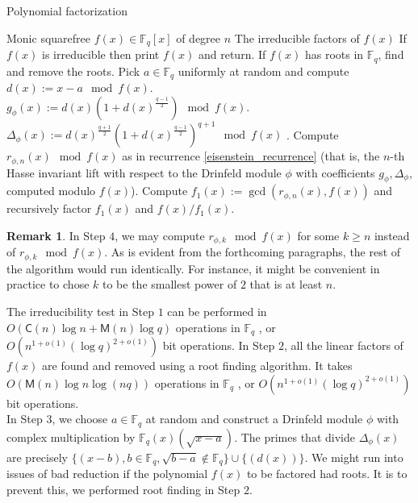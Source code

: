 \documentclass{article}
\theoremstyle{plain}
\theoremstyle{definition}
\newtheorem*{remark}{Remark}
\def\F{\ensuremath{\mathbb{F}}}
\def\K{\ensuremath{\mathbb{K}}}
\def\MM{\ensuremath{\mathsf{M}}}
\def\CC{\ensuremath{\mathsf{C}}}
\newcommand{\D}{\Delta}
\begin{document}
\begin{algorithm}[H]
	\caption{Polynomial factorization}
	\label{factoring_algorithm}
	\begin{algorithmic}[1]
		\REQUIRE Monic squarefree $f(x) \in \F_q[x]$ of degree $n$
		\ENSURE The irreducible factors of $f(x)$
		\STATE If $f(x)$ is irreducible then print $f(x)$ and return.
		\STATE If $f(x)$ has roots in $\F_q$, find and remove the roots.
		\STATE Pick $a \in \F_q$ uniformly at random and compute \\ %
		$d(x) := x-a \mod f(x)$. \\
		$g_\phi(x) := d(x)(1+d(x)^{\frac{q-1}{2}}) \mod f(x)$. \\
		$\Delta_\phi(x) := d(x)^{\frac{q+1}{2}}(1+d(x)^{\frac{q-1}{2}})^{q+1} \mod f(x)$ .
		\STATE Compute $r_{\phi,n}(x) \mod f(x)$ as in recurrence \ref{eisenstein_recurrence} (that is, the $n$-th Hasse invariant lift with respect to the Drinfeld module $\phi$ with coefficients $g_\phi, \Delta_\phi$, computed modulo $f(x)$).
		\STATE Compute $f_1(x) := \gcd(r_{\phi,n}(x), f(x))$ and recursively factor $f_1(x)$ and $f(x)/f_1(x)$.
	\end{algorithmic}
\end{algorithm}

\begin{remark}
	In Step $4$, we may compute $r_{\phi,k} \mod f(x)$ for some $k\geq n$ instead of $r_{\phi,k} \mod f(x)$. As is evident from the forthcoming paragraphs, the rest of the algorithm would run identically. For instance, it might be convenient in practice to chose $k$ to be the smallest power of $2$ that is at least $n$.
\end{remark}


The irreducibility test in Step $1$ can be performed in $O(\CC(n)\log n + \MM(n)\log q)$ operations 
in $\F_q$ \cite{vzGG}, or $O(n^{1+o(1)} (\log q)^{2+o(1)})$ bit operations. In Step $2$, all the 
linear factors of $f(x)$ are found and removed using a root finding algorithm. It takes 
$O(\MM(n)\log n \log(nq))$ operations in $\F_q$ \cite{vzGG}, or $O(n^{1+o(1)} (\log q)^{2+o(1)})$ 
bit operations. \\

 In Step $3$, we choose $a \in \F_q$ at random and construct a Drinfeld module $\phi$ with complex 
 multiplication by $\F_q(x)(\sqrt{x-a})$. The primes that divide $\D_\phi(x)$ are precisely 
 $\{(x-b),  b \in \F_q, \sqrt{b-a} \notin \F_q\} \cup \{(d(x))\}$. We might run into issues of bad 
 reduction if the polynomial $f(x)$ to be factored had roots. It is to prevent this, we performed 
 root finding in Step $2$. \\
\end{document}
